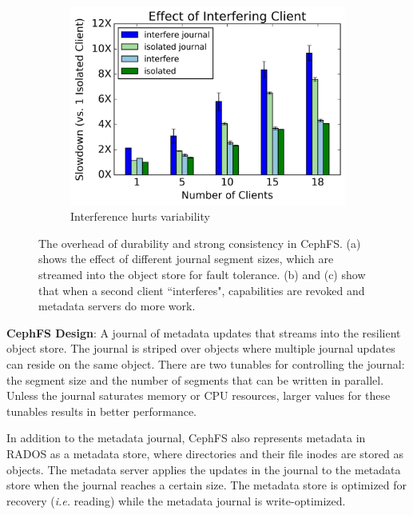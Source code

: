 \begin{figure}[t]
\begin{subfigure}[b]{.3\linewidth}
      \label{fig:overhead-b}
  \end{subfigure}
  \begin{subfigure}[b]{.3\linewidth}
      \centering
      \includegraphics[width=1.1\linewidth]{./chapters/cudele/figures/slowdown-interfere-scale.png}
      \caption{Interference hurts variability}
      \label{fig:overhead-c}
  \end{subfigure}
  \caption{The overhead of durability and strong consistency in CephFS.
  (a) shows the effect of different journal segment sizes, which are streamed
  into the object store for fault tolerance. (b) and (c) show that when a second
  client ``interferes", capabilities are revoked and metadata servers do more
  work.  \label{fig:overhead}}
\end{figure}

\textbf{CephFS Design}: A journal of metadata updates that streams into the
resilient object store.  The journal is striped over objects where multiple
journal updates can reside on the same object. There are two tunables for
controlling the journal: the segment size and the number of segments that can
be written in parallel. Unless the journal saturates memory or CPU resources,
larger values for these tunables results in better performance.

In addition to the metadata journal, CephFS also represents metadata in RADOS
as a metadata store, where directories and their file inodes are stored as
objects.  The metadata server applies the updates in the journal to the
metadata store when the journal reaches a certain size. The metadata store is
optimized for recovery ({\it i.e.} reading) while the metadata journal is
write-optimized.

